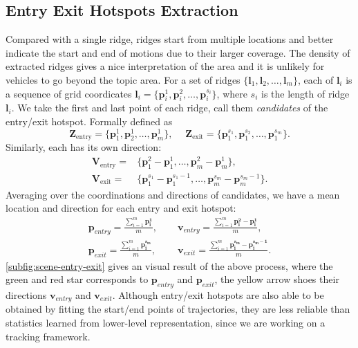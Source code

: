 \subsection{Entry Exit Hotspots Extraction}
\label{subsec:hdp-entry-exit}
Compared with a single ridge, ridges start from multiple locations and better indicate the start and end of motions due to their larger coverage.  The density of extracted ridges gives a nice interpretation of the area and it is unlikely for vehicles to go beyond the topic area. 
For a set of ridges $\{\bm{l}_1, \bm{l}_2, \dots, \bm{l}_m\}$, 
each of $\bm{l}_i$ is a sequence of grid coordicates $\bm{l}_i=\{\bm{p}_i^1, \bm{p}_i^2, \dots, \bm{p}_i^{s_i}\}$, 
where $s_i$ is the length of ridge $\bm{l}_i$. 
We take the first and last point of each ridge, call them \emph{candidates} of the entry/exit hotspot. Formally defined as 
$$\mathbf{Z}_\text{entry} = \{\bm{p}_1^1, \bm{p}_2^1, \dots, \bm{p}_m^1\},\; \quad
\mathbf{Z}_\text{exit} = \{\bm{p}_1^{s_1}, \bm{p}_1^{s_2}, \dots, \bm{p}_1^{s_m}\}.$$
Similarly, each has its own direction: 
\begin{align*}
\mathbf{V}_\text{entry} =& \{\bm{p}_1^2 -\bm{p}_1^1, \dots, \bm{p}_m^2-\bm{p}_m^1\},\\
\mathbf{V}_\text{exit} = &\{\bm{p}_1^{s_1}-\bm{p}_1^{s_1-1}, \dots, \bm{p}_{m}^{s_m}-\bm{p}_{m}^{s_m-1}\}.
\end{align*}
Averaging over the coordinations and directions of candidates, we have a mean location and direction for each entry and exit hotspot: 
\begin{align}
\bm{p}_{entry} = \frac{\sum_{i=1}^m{\bm{p_i^1}}}{m},\;\quad&\bm{v}_{entry} = \frac{\sum_{i=1}^m{\bm{p_i^2}-\bm{p_i^1}}}{m},\\
\bm{p}_{exit} = \frac{\sum_{i=1}^m{\bm{p_i^{s_m}}}}{m},\;\quad&\bm{v}_{exit} = \frac{\sum_{i=1}^m{\bm{p_i^{s_m}}-\bm{p_i^{s_m-1}}}}{m}.
\end{align}
\ref{subfig:scene-entry-exit} gives an visual result of the above process, 
where the green and red star corresponds to $\bm{p}_{entry}$ and $\bm{p}_{exit}$, the yellow arrow shoes their directions $\bm{v}_{entry}$ and $\bm{v}_{exit}$.
Although entry/exit hotspots are also able to be obtained by fitting the start/end points of trajectories, they are less reliable than statistics learned from lower-level representation, since we are working on a tracking framework.

